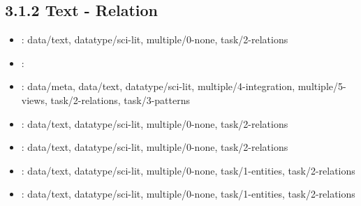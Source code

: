\begin {refsection}
\section [3.1.2 Text - Relation] {3.1.2 Text - Relation}

\begin {itemize}
\item \cite {osborne-2013-exploring-scholarly-data-with-rexplore}:
    data/text, datatype/sci-lit, multiple/0-none, task/2-relations


\item \cite {gorg-2010-visualization-and-language-processing-for-supporting-analysis}:
    


\item \cite {goerg-2013-combining-computational-analyses-and-interactive-visualization}:
    data/meta, data/text, datatype/sci-lit, multiple/4-integration, multiple/5-views, task/2-relations, task/3-patterns


\item \cite {nakazawa-2015-a-visualization-of-research-papers-based-on-the-topics}:
    data/text, datatype/sci-lit, multiple/0-none, task/2-relations


\item \cite {riehmann-2015-visual-assessment-of-alleged-plagiarism-cases}:
    data/text, datatype/sci-lit, multiple/0-none, task/2-relations


\item \cite {chuang-2012-interpretation-and-trust:-designing-model-driven-visualizations}:
    data/text, datatype/sci-lit, multiple/0-none, task/1-entities, task/2-relations


\item \cite {lee-2005-understanding-research-trends-in-conferences-using}:
    data/text, datatype/sci-lit, multiple/0-none, task/1-entities, task/2-relations


\end {itemize}
\printbibliography
\end {refsection}\pagebreak

